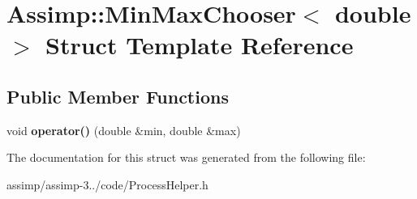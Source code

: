 \hypertarget{struct_assimp_1_1_min_max_chooser_3_01double_01_4}{\section{Assimp\+:\+:Min\+Max\+Chooser$<$ double $>$ Struct Template Reference}
\label{struct_assimp_1_1_min_max_chooser_3_01double_01_4}
}
\subsection*{Public Member Functions}
\begin{DoxyCompactItemize}
\item 
\hypertarget{struct_assimp_1_1_min_max_chooser_3_01double_01_4_aedd8c1e9aad7bdb345b690788899f7ab}{void {\bfseries operator()} (double \&min, double \&max)}\label{struct_assimp_1_1_min_max_chooser_3_01double_01_4_aedd8c1e9aad7bdb345b690788899f7ab}

\end{DoxyCompactItemize}


The documentation for this struct was generated from the following file\+:\begin{DoxyCompactItemize}
\item 
assimp/assimp-\/3../code/Process\+Helper.\+h\end{DoxyCompactItemize}
